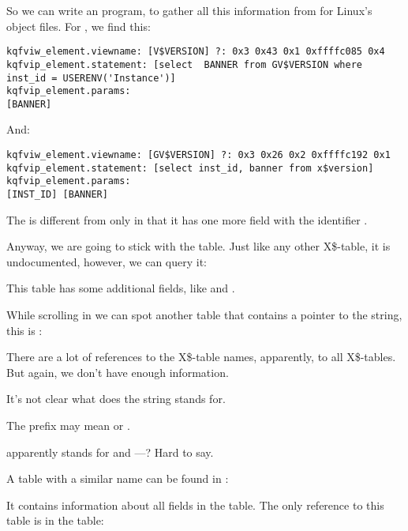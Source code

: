 So we can write an \oracletables program, to gather all this information from \oracle for Linux's object files.
For , we find this:

\begin{lstlisting}[caption=Result of \OracleTablesName]
kqfviw_element.viewname: [V$VERSION] ?: 0x3 0x43 0x1 0xffffc085 0x4
kqfvip_element.statement: [select  BANNER from GV$VERSION where inst_id = USERENV('Instance')]
kqfvip_element.params:
[BANNER] 
\end{lstlisting}

And:

\begin{lstlisting}[caption=Result of \OracleTablesName]
kqfviw_element.viewname: [GV$VERSION] ?: 0x3 0x26 0x2 0xffffc192 0x1
kqfvip_element.statement: [select inst_id, banner from x$version]
kqfvip_element.params:
[INST_ID] [BANNER] 
\end{lstlisting}

The   is different from  only in that it has one more field with the identifier .

Anyway, we are going to stick with the  table. Just like any other X\$-table, it is undocumented, however, we can query it:



This table has some additional fields, like  and .

While scrolling  in \IDA we can spot another table that contains a pointer to the  string, this is :



There are a lot of references to the X\$-table names, apparently, to all  X\$-tables.
But again, we don't have enough information.

It's not clear what does the  string stands for. 

The  prefix may mean  or . 

 apparently stands for  and ---? 
Hard to say.

A table with a similar name can be found in :



It contains information about all fields in the  table.
The only reference to this table is in the  table:

